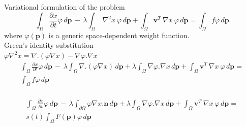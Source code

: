 \documentclass{beamer}
\newcommand{\mb}{\mathbf}
\begin{document}
\begin{frame}{Variational formulation of the problem}
\[
	\int_\Omega \frac{\partial x}{\partial t} \varphi \, d\mb{p} \, - \,
	\lambda \int_\Omega ~\nabla^2 x~ \varphi \, d\mb{p} +
	\int_\Omega \mb{v}^T  ~\nabla x~ \varphi \, d\mb{p} =
	\int_\Omega f \varphi \, d\mb{p}
	\]
	where $\varphi(\mb{p})$ is a generic space-dependent weight function.
\\ 	
\vspace{2mm}
Green's identity substitution\\
$\varphi \nabla^2 x = \nabla . (\varphi \nabla x) - \nabla \varphi . \nabla x$\\

\[
\begin{array}{l}
	\displaystyle
	\int_\Omega \frac{\partial x}{\partial t} \varphi \, d\mb{p} \, - \,
	\lambda \int_\Omega \nabla . (\varphi \nabla x) \, d\mb{p} + \lambda \int_\Omega \nabla \varphi . \nabla x \, d\mb{p} +
	\int_\Omega \mb{v}^T  ~\nabla x~ \varphi \, d\mb{p} = \\ [4mm]
	\displaystyle
	\int_\Omega f \varphi \, d\mb{p}
\end{array}
	\]\\
	
	\[
	\begin{array}{l}
	\displaystyle
	\int_\Omega \frac{\partial x}{\partial t} \varphi \, d\mb{p} \, - \,
	\lambda \int_{\partial \Omega} \varphi \nabla x . \mb{n} \, d\mb{p} + \lambda \int_\Omega \nabla \varphi . \nabla x \, d\mb{p} +
	\int_\Omega \mb{v}^T  ~\nabla x~ \varphi \, d\mb{p} = \\ [4mm]
	\displaystyle
	s(t) \int_\Omega F(\mb{p}) \varphi \, d\mb{p}
	
	\end{array}
	\]
\end{frame}
\end{document}
